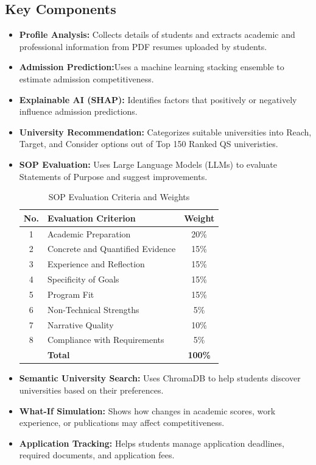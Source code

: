 \subsection{Key Components}

\begin{itemize}
    \item \textbf{Profile Analysis:} Collects details of students and extracts academic and professional information from PDF resumes uploaded by students.

    \item \textbf{Admission Prediction:}Uses a machine learning stacking ensemble to estimate admission competitiveness.

    \item \textbf{Explainable AI (SHAP):} Identifies factors that positively or negatively influence admission predictions.

    \item \textbf{University Recommendation:} Categorizes suitable universities into Reach, Target, and Consider options out of Top 150 Ranked QS univeristies.

    \item \textbf{SOP Evaluation:} Uses Large Language Models (LLMs) to evaluate Statements of Purpose and suggest improvements.\cite{mit_sop,cmu_admissions,cmu_sop_guidelines,mit_faculty_essay}

    
\begin{table}[htbp]
\caption{SOP Evaluation Criteria and Weights}
\label{tab:sop_rubric}
\centering
\begin{tabular}{clc}
\hline
\textbf{No.} & \textbf{Evaluation Criterion} & \textbf{Weight} \\
\hline
1 & Academic Preparation & 20\% \\
2 & Concrete and Quantified Evidence & 15\% \\
3 & Experience and Reflection & 15\% \\
4 & Specificity of Goals & 15\% \\
5 & Program Fit & 15\% \\
6 & Non-Technical Strengths & 5\% \\
7 & Narrative Quality & 10\% \\
8 & Compliance with Requirements & 5\% \\
\hline
 & \textbf{Total} & \textbf{100\%} \\
\hline
\end{tabular}
\end{table}



    \item \textbf{Semantic University Search:} Uses ChromaDB to help students discover universities based on their preferences.

    \item \textbf{What-If Simulation:} Shows how changes in academic scores, work experience, or publications may affect competitiveness.

    \item \textbf{Application Tracking:} Helps students manage application deadlines, required documents, and application fees.
\end{itemize}

